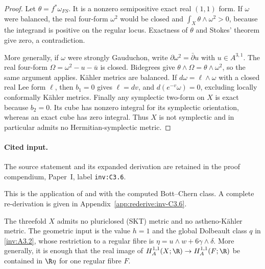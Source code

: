 \begin{proof}
Let $\theta=f^*\omega_{FS}$.  It is a nonzero semipositive exact
real $(1,1)$ form.  If $\omega$ were balanced, the real four-form
$\omega^2$ would be closed and
$\int_X\theta\wedge\omega^2>0$, because the integrand is positive
on the regular locus.  Exactness of $\theta$ and Stokes' theorem
give zero, a contradiction.

More generally, if $\omega$ were strongly Gauduchon, write
$\partial\omega^2=\bar\partial u$ with $u\in A^{3,1}$.
The real four-form $\Omega=\omega^2-u-\bar u$ is closed.
Bidegrees give $\theta\wedge\Omega=\theta\wedge\omega^2$,
so the same argument applies.  K\"ahler metrics are balanced.
If $d\omega=\ell\wedge\omega$ with a closed real Lee form
$\ell$, then $b_1=0$ gives $\ell=dv$, and
$d(e^{-v}\omega)=0$, excluding locally conformally K\"ahler metrics.
Finally any symplectic two-form on $X$ is exact because $b_2=0$.
Its cube has nonzero integral for its symplectic orientation, whereas
an exact cube has zero integral.  Thus $X$ is not symplectic and in
particular admits no Hermitian-symplectic metric.
\end{proof}


\paragraph{Cited input.} \label{inv:C3.6}\label{inv:eq:C-Ricci}The source statement and its expanded derivation are retained in the proof compendium, Paper~I, label \nolinkurl{inv:C3.6}.\par



This is the application of \citet[Theorem~2]{Gauduchon1985} and \citet[Theorem~1.3]{STW2017} with the computed Bott--Chern class. A complete re-derivation is given in Appendix~\ref{app:rederive:inv-C3.6}.


\begin{proposition}\label{inv:C3.7}
The threefold $X$ admits no pluriclosed (SKT) metric and no
astheno-K\"ahler metric.  The geometric input is the value $h=1$
and the global Dolbeault class $q$ in \ref{inv:A3.2}, whose restriction to a
regular fibre is $\eta=u\wedge w+6\gamma\wedge\delta$.
More generally, it is enough that the real image of
$H_A^{1,1}(X;\R)\to H_A^{1,1}(F;\R)$ be contained in
$\R\eta$ for one regular fibre $F$.
\end{proposition}


